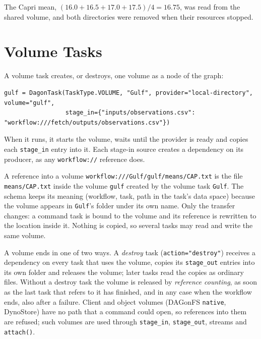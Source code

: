 



The Capri mean, $(16.0+16.5+17.0+17.5)/4 = 16.75$, was read from the shared
volume, and both directories were removed when their resources stopped.

\section{Volume Tasks}
\label{sec:volume-tasks}

A volume task creates, or destroys, one volume as a node of the graph:

\begin{lstlisting}
gulf = DagonTask(TaskType.VOLUME, "Gulf", provider="local-directory", volume="gulf",
                 stage_in={"inputs/observations.csv": "workflow:///fetch/outputs/observations.csv"})
\end{lstlisting}

When it runs, it starts the volume, waits until the provider is ready and
copies each \texttt{stage\_in} entry into it. Each stage-in source creates a
dependency on its producer, as any \texttt{workflow://} reference does.

\begin{definitionbox}{A reference into a volume}
\sloppy
\texttt{workflow:///Gulf/gulf/means/CAP.txt} is the file \texttt{means/CAP.txt}
inside the volume \texttt{gulf} created by the volume task \texttt{Gulf}. The
schema keeps its meaning (workflow, task, path in the task's data space)
because the volume appears in \texttt{Gulf}'s folder under its own name. Only
the transfer changes: a command task is bound to the volume and its reference
is rewritten to the location inside it. Nothing is copied, so several tasks may
read and write the same volume.
\end{definitionbox}

A volume ends in one of two ways. A \emph{destroy} task
(\texttt{action="destroy"}) receives a dependency on every task that uses the
volume, copies its \texttt{stage\_out} entries into its own folder and releases
the volume; later tasks read the copies as ordinary files. Without a destroy
task the volume is released by \emph{reference counting}, as soon as the last
task that refers to it has finished, and in any case when the workflow ends,
also after a failure. Client and object volumes (DAGonFS \texttt{native},
DynoStore) have no path that a command could open, so references into them are
refused; such volumes are used through \texttt{stage\_in}, \texttt{stage\_out},
streams and \texttt{attach()}.

